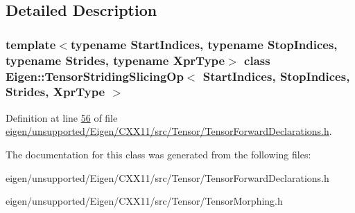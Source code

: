 \subsection{Detailed Description}
\subsubsection*{template$<$typename Start\+Indices, typename Stop\+Indices, typename Strides, typename Xpr\+Type$>$\newline
class Eigen\+::\+Tensor\+Striding\+Slicing\+Op$<$ Start\+Indices, Stop\+Indices, Strides, Xpr\+Type $>$}



Definition at line \hyperlink{eigen_2unsupported_2_eigen_2_c_x_x11_2src_2_tensor_2_tensor_forward_declarations_8h_source_l00056}{56} of file \hyperlink{eigen_2unsupported_2_eigen_2_c_x_x11_2src_2_tensor_2_tensor_forward_declarations_8h_source}{eigen/unsupported/\+Eigen/\+C\+X\+X11/src/\+Tensor/\+Tensor\+Forward\+Declarations.\+h}.



The documentation for this class was generated from the following files\+:\begin{DoxyCompactItemize}
\item 
eigen/unsupported/\+Eigen/\+C\+X\+X11/src/\+Tensor/\+Tensor\+Forward\+Declarations.\+h\item 
eigen/unsupported/\+Eigen/\+C\+X\+X11/src/\+Tensor/\+Tensor\+Morphing.\+h\end{DoxyCompactItemize}
